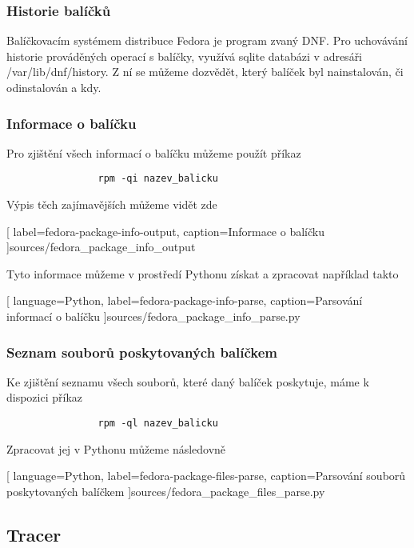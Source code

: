 \documentclass[10pt,a4paper]{article}
\begin{document}
			\subsubsection{Historie balíčků}
			Balíčkovacím systémem distribuce Fedora je program zvaný DNF\@. Pro uchovávání historie prováděných operací s balíčky, využívá sqlite databázi v adresáři /var/lib/dnf/history. Z ní se můžeme dozvědět, který balíček byl nainstalován, či odinstalován a kdy.


			\subsubsection{Informace o balíčku}
			Pro zjištění všech informací o balíčku můžeme použít příkaz

			\begin{lstlisting}
				rpm -qi nazev_balicku
			\end{lstlisting}

			Výpis těch zajímavějších můžeme vidět zde
			
			[
				label=fedora-package-info-output,
				caption={Informace o balíčku}
			]{sources/fedora_package_info_output}

			Tyto informace můžeme v prostředí Pythonu získat a zpracovat například takto
			
			[
				language=Python,
				label=fedora-package-info-parse,
				caption={Parsování informací o balíčku}
			]{sources/fedora_package_info_parse.py}

			\subsubsection{Seznam souborů poskytovaných balíčkem}
			Ke zjištění seznamu všech souborů, které daný balíček poskytuje, máme k dispozici příkaz

			\begin{lstlisting}
				rpm -ql nazev_balicku
			\end{lstlisting}

			Zpracovat jej v Pythonu můžeme následovně

			
			[
				language=Python,
				label=fedora-package-files-parse,
				caption={Parsování souborů poskytovaných balíčkem}
			]{sources/fedora_package_files_parse.py}

		\subsection{Tracer}
\end{document}
